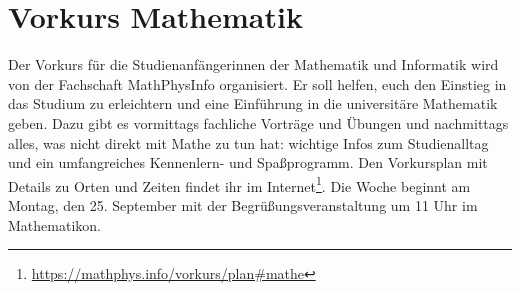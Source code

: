 \section{Vorkurs Mathematik}
Der Vorkurs für die Studienanfängerinnen der Mathematik und Informatik wird von der Fachschaft MathPhysInfo organisiert. Er soll helfen, euch den Einstieg in das Studium zu erleichtern und eine Einführung in die universitäre Mathematik geben. Dazu gibt es vormittags fachliche Vorträge und Übungen und nachmittags alles, was nicht direkt mit Mathe zu tun hat: wichtige Infos zum Studienalltag und ein umfangreiches Kennenlern- und Spaßprogramm. Den Vorkursplan mit Details zu Orten und Zeiten findet ihr im Internet\footnote{\label{mathe-vorkursplan}\url{https://mathphys.info/vorkurs/plan\#mathe}}. Die Woche beginnt am Montag, den 25. September mit der Begrüßungsveranstaltung um 11 Uhr im \gls{Mathematikon}.

